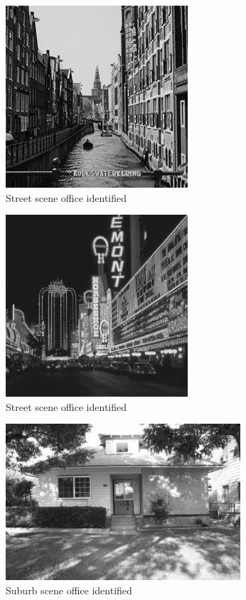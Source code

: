 \begin{homeworkProblem}
\begin{figure}[H]
\begin{subfigure}{0.5\textwidth}
  \end{subfigure}
  \begin{subfigure}{0.5\textwidth}
    \centering
    \caption{Street scene office identified}
    \includegraphics[width=.5\linewidth]{./images/7_street.jpg}
  \end{subfigure}%
  \begin{subfigure}{0.5\textwidth}
    \centering
    \caption{Street scene office identified}
    \includegraphics[width=.5\linewidth]{./images/7_sstreet.jpg}
  \end{subfigure}
  \begin{subfigure}{0.5\textwidth}
    \centering
    \caption{Suburb scene office identified}
    \includegraphics[width=.5\linewidth]{./images/8_ssurb.jpg}
  \end{subfigure}%
  \begin{subfigure}{0.5\textwidth}

\end{subfigure}
\end{figure}
\end{homeworkProblem}
